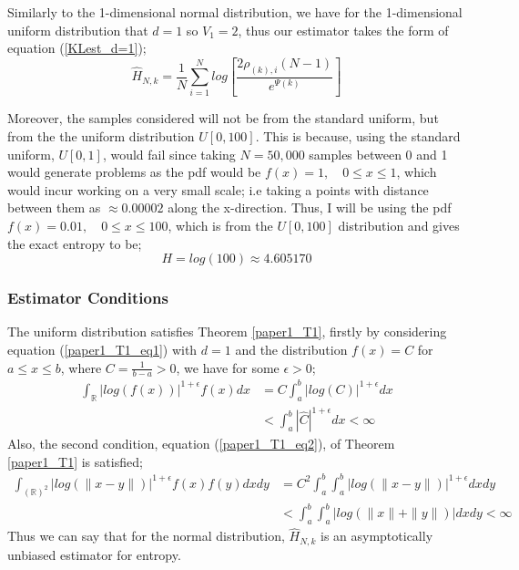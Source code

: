 \documentclass{article}
\begin{document}
 Similarly to the 1-dimensional normal distribution, we have for the 1-dimensional uniform distribution that $d=1$ so $V_{1} = 2$, thus our estimator takes the form of equation (\ref{KLest_d=1});
\begin{equation}
\hat{H}_{N, k} =  \frac{1}{N} \sum_{i=1}^{N} log \left[ \frac{2\rho_{(k),i}(N-1)}{e^{\Psi(k)}} \right]\nonumber
\end{equation}

Moreover, the samples considered will not be from the standard uniform, but from the the uniform distribution $U[0,100]$. This is because, using the standard uniform, $U[0,1]$, would fail since taking $N=50,000$ samples between 0 and 1 would generate problems as the pdf would be $f(x) = 1 , \quad 0 \leq x \leq 1$, which would incur working on a very small scale; i.e taking a points with distance between them as $\approx 0.00002$ along the x-direction. Thus, I will be using the pdf $f(x) = 0.01 , \quad 0 \leq x \leq 100$, which is from the $U[0,100]$ distribution and gives the exact entropy to be;
\begin{equation} \label{uniform_exact}
H = log(100) \approx 4.605170
\end{equation}




\subsubsection{Estimator Conditions} \label{U_Conditions}

The uniform distribution satisfies Theorem \ref{paper1_T1}, firstly by considering equation (\ref{paper1_T1_eq1}) with $d=1$ and the distribution $f(x)=C$ for $a \leq x \leq b$, where $C = \frac{1}{b-a} >0$, we have for some $\epsilon >0$;
\begin{align} \nonumber
\int_{\mathbb{R}} | log(f(x))|^{1 + \epsilon} f(x) dx  &= C \int_{a}^{b} | log (C) |^{1 + \epsilon} dx \\ \nonumber 
&<  \int_{a}^{b} | \hat{C} |^{1 + \epsilon}  dx  < \infty \nonumber
\end{align}
Also, the second condition, equation (\ref{paper1_T1_eq2}), of Theorem \ref{paper1_T1} is satisfied;
\begin{align} \nonumber
\int_{(\mathbb{R})^2} | log(\|x-y\|)|^{1+ \epsilon} f(x) f(y) dx dy  &= C^2 \int_{a}^{b} \int_{a}^{b} | log(\|x-y\|)|^{1+ \epsilon} dx dy \\ \nonumber
&< \int_{a}^{b} \int_{a}^{b} | log(\|x\| + \|y\|)| dx dy < \infty  \nonumber
\end{align}
Thus we can say that for the normal distribution, $\hat{H}_{N,k}$ is an asymptotically unbiased estimator for entropy. 
\end{document}
